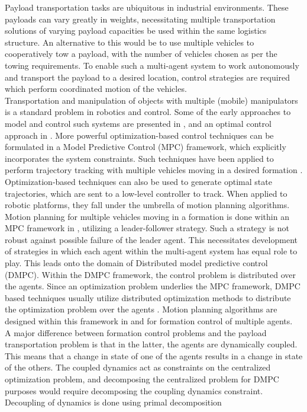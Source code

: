 \documentclass[letterpaper, 10 pt, conference]{ieeeconf}
\begin{document}
Payload transportation tasks are ubiquitous in industrial environments. These payloads can vary greatly in weights, necessitating multiple transportation solutions of varying payload capacities be used within the same logistics structure. An alternative to this would be to use multiple vehicles to cooperatively tow a payload, with the number of vehicles chosen as per the towing requirements. To enable such a multi-agent system to work autonomously and transport the payload to a desired location, control strategies are required which perform coordinated motion of the vehicles.
\\
\indent Transportation and manipulation of objects with multiple (mobile) manipulators is a standard problem in robotics and control. Some of the early approaches to model and control such systems are presented in \cite{c1} \cite{c2} \cite{c3}, and an optimal control approach in \cite{c4}. More powerful optimization-based control techniques can be formulated in a Model Predictive Control (MPC) framework, which explicitly incorporates the system constraints. Such techniques have been applied to perform trajectory tracking with multiple vehicles moving in a desired formation \cite{c5}. Optimization-based techniques can also be used to generate optimal state trajectories, which are sent to a low-level controller to track. When applied to robotic platforms, they fall under the umbrella of motion planning algorithms. Motion planning for multiple vehicles moving in a formation is done within an MPC framework in \cite{c6}, utilizing a leader-follower strategy. Such a strategy is not robust against possible failure of the leader agent. This necessitates development of strategies in which each agent within the multi-agent system has equal role to play. This leads onto the domain of Distributed model predictive control (DMPC). Within the DMPC framework, the control problem is distributed over the agents. Since an optimization problem underlies the MPC framework, DMPC based techniques usually utilize distributed optimization methods to distribute the optimization problem over the agents \cite{c7}. Motion planning algorithms are designed within this framework in \cite{c8} and \cite{c9} for formation control of multiple agents.
\\
\indent
 A major difference between formation control problems and the payload transportation problem is that in the latter, the agents are dynamically coupled. This means that a change in state of one of the agents results in a change in state of the others. The coupled dynamics act as constraints on the centralized optimization problem, and decomposing the centralized problem for DMPC purposes would require decomposing the coupling dynamics constraint. Decoupling of dynamics is done using primal decomposition
\end{document}
